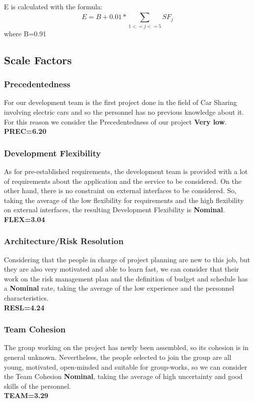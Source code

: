 \begin{itemize}
	E is calculated with the formula:
	\begin{equation}
	E = B + 0.01 * \sum_{1<=j<=5}^{} SF_{j}
	\end{equation}
	where B=0.91
\end{itemize}


\subsection{Scale Factors}
\subsubsection{Precedentedness}
For our development team is the first project done in the field of Car Sharing involving electric cars and so the personnel has no previous knowledge about it. For this reason we consider the Precedentedness of our project \textbf{Very low}.\\
\textbf{PREC=6.20}

\subsubsection{Development Flexibility}
As for pre-established requirements, the development team is provided with a lot of requirements about the application and the service to be considered. On the other hand, there is no constraint on external interfaces to be considered.
So, taking the average of the low flexibility for requirements and the high flexibility on external interfaces, the resulting Development Flexibility is \textbf{Nominal}.\\
\textbf{FLEX=3.04}

\subsubsection{Architecture/Risk Resolution}
Considering that the people in charge of project planning are new to this job, but they are also very motivated and able to learn fast, we can consider that their work on the risk management plan and the definition of budget and schedule has a \textbf{Nominal} rate, taking the average of the low experience and the personnel characteristics.\\
\textbf{RESL=4.24}

\subsubsection{Team Cohesion}
The group working on the project has newly been assembled, so its cohesion is in general unknown. Nevertheless, the people selected to join the group are all young, motivated, open-minded and suitable for group-works, so we can consider the Team Cohesion \textbf{Nominal}, taking the average of high uncertainty and good skills of the personnel.\\
\textbf{TEAM=3.29}


